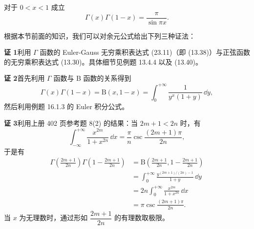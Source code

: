 \begin{xproposition}[23.3.3（余元公式）]
对于 $0<x<1$ 成立
\[
  \Gamma(x)\Gamma(1-x)=\frac\pi{\sin\pi x}.
\]
\end{xproposition}
根据本节前面的知识，我们可以对余元公式给出下列三种证法：

\textbf{证 1}\quad 利用 $\Gamma$ 函数的 Euler-Gauss 无穷乘积表达式 (23.11)（即 (13.38)）与正弦函数的无穷乘积表达式 (13.30)。具体细节见例题 13.4.4 以及 (13.40)。

\textbf{证 2}\quad 首先利用 $\Gamma$ 函数与 B 函数的关系得到
\[
  \Gamma(x)\Gamma(1-x)=\mathrm{B}(x,1-x)=\int_0^{+\infty}\frac1{y^x(1+y)}\,\dd y,
\]
然后利用例题 16.1.3 的 Euler 积分公式。

\textbf{证 3}\quad 利用上册 402 页参考题 8(2) 的结果：当 $2m+1<2n$ 时，有
\[
  \int_{-\infty}^{+\infty}\frac{x^{2m}}{1+x^{2n}}\,\dd x
  =\frac\pi n\csc\frac{(2m+1)\pi}{2n},
\]
于是有
\[
\begin{aligned}
  \Gamma\left(\frac{2m+1}{2n}\right)\Gamma\left(1-\frac{2m+1}{2n}\right)
  &=\mathrm{B}\left(\frac{2m+1}{2n},1-\frac{2m+1}{2n}\right)\\
  &=\int_0^{+\infty}\frac{y^{(2m+1)/(2n)-1}}{1+y}\,\dd y\\
  &=2n\int_0^{+\infty}\frac{x^{2m}}{1+x^{2n}}\,\dd x\\
  &=\pi\csc\frac{(2m+1)\pi}{2n}.
\end{aligned}
\]
当 $x$ 为无理数时，通过形如 $\dfrac{2m+1}{2n}$ 的有理数取极限。

